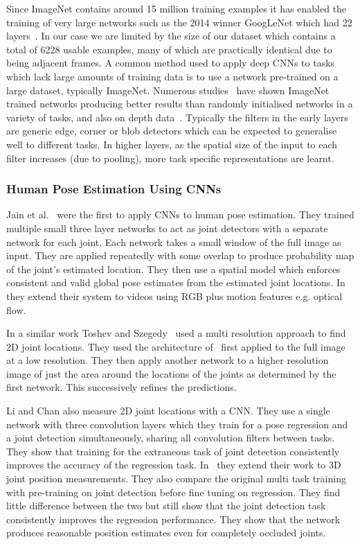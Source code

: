 \documentclass[11pt]{article} %
\begin{document}
Since ImageNet contains around 15 million training examples it has enabled the training of very large networks such as the 2014 winner GoogLeNet which had 22 layers~\cite{Szegedy2014}. In our case we are limited by the size of our dataset which contains a total of 6228 usable examples, many of which are practically identical due to being adjacent frames. A common method used to apply deep CNNs to tasks which lack large amounts of training data is to use a network pre-trained on a large dataset, typically ImageNet. Numerous studies~\cite{Sharif2014,Donahue2014,Oquab2014,Girshick2014,Yosinski2014} have shown ImageNet trained networks producing better results than randomly initialised networks in a variety of tasks, and also on depth data~\cite{Schwarz2015,Alexandre2013}. Typically the filters in the early layers are generic edge, corner or blob detectors which can be expected to generalise well to different tasks. In higher layers, as the spatial size of the input to each filter increases (due to pooling), more task specific representations are learnt. 

\subsubsection{Human Pose Estimation Using CNNs}

\label{sec:HpeCnn} 

Jain et al.~\cite{Jain2013a} were the first to apply CNNs to human pose estimation. They trained multiple small three layer networks to act as joint detectors with a separate network for each joint. Each network takes a small window of the full image as input. They are applied repeatedly with some overlap to produce probability map of the joint's estimated location. They then use a spatial model which enforces consistent and valid global pose estimates from the estimated joint locations. In~\cite{Jain2014} they extend their system to videos using RGB plus motion features e.g. optical flow. 

In a similar work Toshev and Szegedy~\cite{Toshev} used a multi resolution approach to find 2D joint locations. They used the architecture of~\cite{Krizhevsky2012} first applied to the full image at a low resolution. They then apply another network to a higher resolution image of just the area around the locations of the joints as determined by the first network. This successively refines the predictions. 

Li and Chan also measure 2D joint locations with a CNN. They use a single network with three convolution layers which they train for a pose regression and a joint detection simultaneously, sharing all convolution filters between tasks. They show that training for the extraneous task of joint detection consistently improves the accuracy of the regression task. In~\cite{Accv2014} they extend their work to 3D joint position measurements. They also compare the original multi task training with pre-training on joint detection before fine tuning on regression. They find little difference between the two but still show that the joint detection task consistently improves the regression performance. They show that the network produces reasonable position estimates even for completely occluded joints. 
\end{document}
